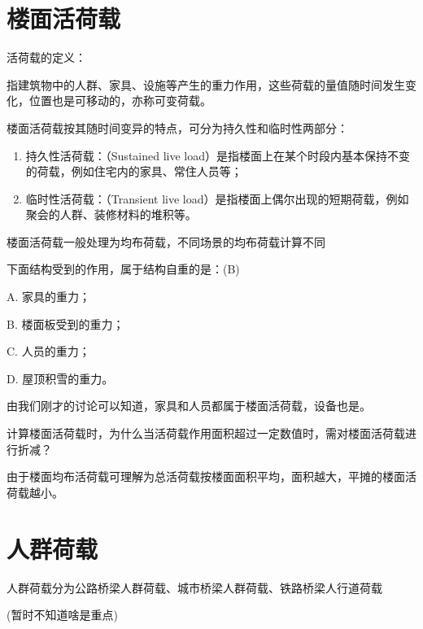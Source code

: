 \documentclass[12pt, a4paper, oneside, UTF8]{ctexbook}
\begin{document}
\section{楼面活荷载}

\begin{definition}
    活荷载的定义：

指建筑物中的人群、家具、设施等产生的重力作用，这些荷载的量值随时间发生变化，位置也是可移动的，亦称{\color{red}可变荷载}。

楼面活荷载按其随时间变异的特点，可分为持久性和临时性两部分：

\begin{enumerate}
    \item 持久性活荷载：（Sustained live load）是指楼面上在某个时段内基本保持不变的荷载，例如住宅内的家具、常住人员等；
    \item 临时性活荷载：（Transient live load）是指楼面上偶尔出现的短期荷载，例如聚会的人群、装修材料的堆积等。
\end{enumerate}

楼面活荷载一般处理为均布荷载，不同场景的均布荷载计算不同
\end{definition}

\begin{example}
下面结构受到的作用，属于结构自重的是：(B)  

A. 家具的重力；  

B. 楼面板受到的重力；  

C. 人员的重力；  

D. 屋顶积雪的重力。
\end{example}

\begin{remark}
    由我们刚才的讨论可以知道，家具和人员都属于楼面活荷载，设备也是。
\end{remark}

\begin{example}
    计算楼面活荷载时，为什么当活荷载作用面积超过一定数值时，需对楼面活荷载进行折减？

    由于楼面均布活荷载可理解为总活荷载按楼面面积平均，面积越大，平摊的楼面活荷载越小。
\end{example}

\section{人群荷载}

\begin{definition}
    人群荷载分为公路桥梁人群荷载、城市桥梁人群荷载、铁路桥梁人行道荷载

    (暂时不知道啥是重点)
\end{definition}

\ifx\allfiles\undefined
\end{document}
